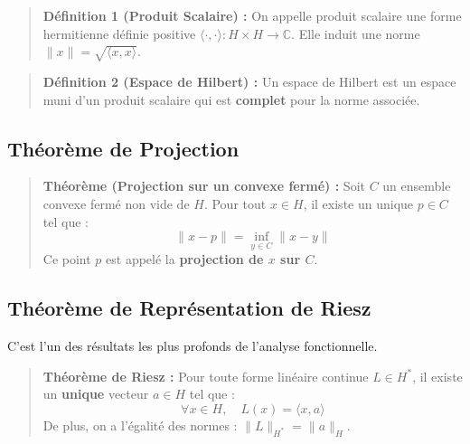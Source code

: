 \documentclass[11pt,a4paper]{article}
\begin{document}
\begin{quote}
\textbf{Définition 1 (Produit Scalaire) :}
On appelle produit scalaire une forme hermitienne définie positive $\langle \cdot, \cdot \rangle : H \times H \to \mathbb{C}$. Elle induit une norme $\|x\| = \sqrt{\langle x, x \rangle}$.
\end{quote}

\begin{quote}
\textbf{Définition 2 (Espace de Hilbert) :}
Un espace de Hilbert est un espace muni d'un produit scalaire qui est \textbf{complet} pour la norme associée.
\end{quote}

\subsection{Théorème de Projection}

\begin{quote}
\textbf{Théorème (Projection sur un convexe fermé) :}
Soit $C$ un ensemble convexe fermé non vide de $H$. Pour tout $x \in H$, il existe un unique $p \in C$ tel que :
$$\|x - p\| = \inf_{y \in C} \|x - y\|$$
Ce point $p$ est appelé la \textbf{projection de $x$ sur $C$}.
\end{quote}


\begin{center}
\end{center}


\subsection{Théorème de Représentation de Riesz}

C'est l'un des résultats les plus profonds de l'analyse fonctionnelle.

\begin{quote}
\textbf{Théorème de Riesz :}
Pour toute forme linéaire continue $L \in H^*$, il existe un \textbf{unique} vecteur $a \in H$ tel que :
$$\forall x \in H, \quad L(x) = \langle x, a \rangle$$
De plus, on a l'égalité des normes : $\|L\|_{H^*} = \|a\|_H$.
\end{quote}
\end{document}
